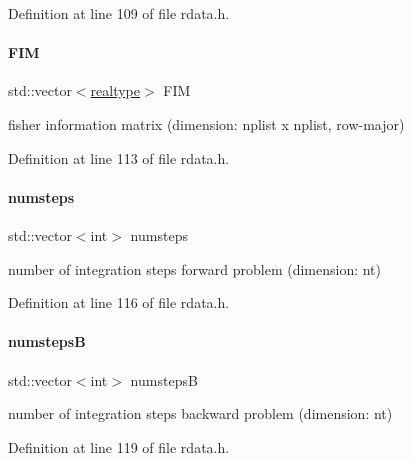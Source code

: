 Definition at line 109 of file rdata.\+h.

\mbox{\label{classamici_1_1_return_data_ac7b78ca07fbf54e5dd558d5fdf520cf0}} 
\paragraph{\texorpdfstring{F\+IM}{FIM}}
{\footnotesize\ttfamily std\+::vector$<$\mbox{\hyperlink{namespaceamici_a1bdce28051d6a53868f7ccbf5f2c14a3}{realtype}}$>$ F\+IM}

fisher information matrix (dimension\+: nplist x nplist, row-\/major) 

Definition at line 113 of file rdata.\+h.

\mbox{\label{classamici_1_1_return_data_acde98b0742196966453b28674762f58f}} 
\paragraph{\texorpdfstring{numsteps}{numsteps}}
{\footnotesize\ttfamily std\+::vector$<$int$>$ numsteps}

number of integration steps forward problem (dimension\+: nt) 

Definition at line 116 of file rdata.\+h.

\mbox{\label{classamici_1_1_return_data_ae0fffbefbc18d93f2ceecc4547a70566}} 
\paragraph{\texorpdfstring{numstepsB}{numstepsB}}
{\footnotesize\ttfamily std\+::vector$<$int$>$ numstepsB}

number of integration steps backward problem (dimension\+: nt) 

Definition at line 119 of file rdata.\+h.

\mbox{\label{classamici_1_1_return_data_a22235e961356f32e211f9b5d8499ad3b}} 
